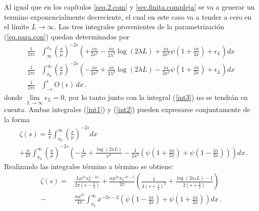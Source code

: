 Al igual que en los capítulos \ref{seq.2.com} y  \ref{sec.finita.compleja} se va a generar un termino exponencialmente decreciente, el cual en este caso va a tender a cero en el límite $L \rightarrow \infty$. Las tres integrales provenientes de la parametrización (\ref{eq.para.con}) quedan determinadas por 
\begin{align}
	\frac{ 1 }{2 \pi i}  
&	
	\int _{\infty} ^{x _0} 
	\left( \frac{x}{\mu} \right) ^{-2s}
	\left( +
	\frac{i \alpha}{2 x^2} - 
	\frac{i \alpha }{2 \lambda ^2} \log ( 2 \lambda L ) +
	\frac{i \alpha}{2 x ^2 } \psi \left( 1 + \frac{i \alpha}{2 x} \right) +
	\epsilon _L
	\right)
	d x
\label{int1}	
\\
	\frac{ 1 }{2 \pi i}  
&	
	\int _{x _0} ^{\infty} 
	\left( \frac{x}{\mu} \right) ^{-2s}
	\left( -
	\frac{i \alpha}{2 x^2} + 
	\frac{i \alpha }{2 \lambda ^2} \log ( 2 \lambda L ) -
	\frac{i \alpha}{2 x ^2 } \psi \left( 1 + \frac{i \alpha}{2 x} \right) +
	\epsilon _L
	\right)
	d x
\label{int2}	
\\
	\frac{ 1 }{2 \pi i}	
&
	\int _{- \epsilon} ^{\epsilon}
	O (\epsilon) \, dx
\label{int3}
\, .	
\end{align}
donde $\lim \limits _{L \rightarrow \infty} \epsilon _L = 0$, por lo tanto junto con la integral (\ref{int3}) no se tendrán en cuenta. Ambas integrales (\ref{int1}) y (\ref{int2}) pueden expresarse conjuntamente de la forma
\begin{align}
&
	\zeta (s)=
	\frac{L }{\pi}
	\int _ {x_0} ^{\infty} \left( \frac{x}{\mu} \right) ^{-2s} dx
\\	 
& 
\nonumber
	+
	\frac{\alpha }{2 \pi } \int _{x_0} ^{\infty} 
	\left( \frac{x}{\mu} \right) ^{-2s}
	\left(-
	\frac{1}{ x ^2} +
	\frac{\log \left( 2 x L \right) }{x ^2}  -
	\frac{1}{ 2 x ^2 } 
	\left(
	\psi \left( 1 + \frac{i \alpha}{2  x} \right) + \psi \left( 1 - \frac{i \alpha}{2 x} \right) 
	\right)
	\right)
	d x
	\, .
\end{align}
Realizando las integrales término a término se obtiene:
\begin{align}
	\zeta (s)=
&
\nonumber
	\frac{L  \mu ^{2s} x _0 ^{1-2s} }{2 \pi \left( s- \frac{1}{2} \right)}  + 
	\frac{\alpha \mu ^{2s} x _{0} ^{-2s-1} }{2 \pi} 
	\left( 
	\frac{1}{4 \left(s+ \frac{1}{2} \right) ^2} +
	\frac{\log(2 x _0 L) -1 }{2 \left(s+\frac{1}{2} \right)} 
	\right) 
\\
-
&	
	\frac{\alpha \mu ^{2s} }{4 \pi}
	\int _{x_0} ^{\infty} 
	x ^{-2s-2}
	\left(
	\psi \left( 1 - \frac{i \alpha}{2 x} \right) +
	\psi \left( 1 + \frac{i \alpha}{2 x} \right)
	\right)
	dx
\, .
\end{align}
